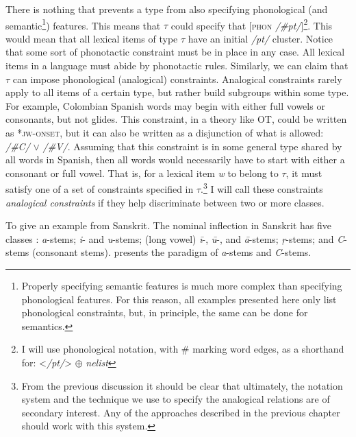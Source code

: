 There is nothing that prevents a type from also specifying phonological (and semantic\footnote{Properly specifying semantic features is much more complex than specifying phonological features. For this reason, all examples presented here only list phonological constraints, but, in principle, the same can be done for semantics.}) features. This means that $\tau$ could specify that [\textsc{phon} \textit{/\#pt/}]\footnote{I will use phonological notation, with \# marking word edges, as a shorthand for: <\textit{/pt/}> $\oplus$ \textit{nelist}}. This would mean that all lexical items of type $\tau$ have an initial \textit{/pt/} cluster. Notice that some sort of phonotactic constraint must be in place in any case. All lexical items in a language must abide by phonotactic rules. Similarly, we can claim that $\tau$ can impose phonological (analogical) constraints. Analogical constraints rarely apply to all items of a certain type, but rather build subgroups within some type. For example, Colombian Spanish words may begin with either full vowels or consonants, but not glides. This constraint, in a theory like OT, could be written as *\textsc{jw-onset}, but it can also be written as a disjunction of what is allowed: \textit{/\#C/} $\lor$ \textit{/\#V/}. Assuming that this constraint is in some general type shared by all words in Spanish, then all words would necessarily have to start with either a consonant or full vowel. That is, for a lexical item \textit{w} to belong to $\tau$, it must satisfy one of a set of constraints specified in $\tau$.\footnote{From the previous discussion it should be clear that ultimately, the notation system and the technique we use to specify the analogical relations are of secondary interest. Any of the approaches described in the previous chapter should work with this system.} I will call these constraints \textit{analogical constraints} if they help discriminate between two or more classes.

To give an example from Sanskrit. The nominal inflection in Sanskrit has five classes \autocite{Whitney.1986}: \textit{a}-stems; \textit{i}- and \textit{u}-stems; (long vowel) \textit{ī}-, \textit{ū}-, and \textit{ā}-stems; \textit{ṛ}-stems; and \textit{C}-stems (consonant stems).  presents the paradigm of \textit{a}-stems and \textit{C}-stems.


